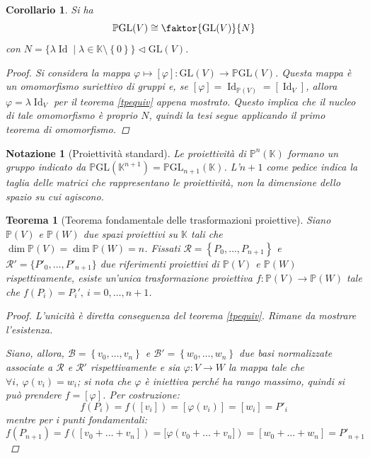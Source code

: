 \documentclass[12pt]{scrartcl}
\theoremstyle{style}
\newtheorem{teorema}{Teorema}[section]
\newtheorem{corollario}{Corollario}[teorema]
\newtheorem{notazione}{Notazione}[section]
\numberwithin{equation}{subsection}
\begin{document}
\begin{corollario}
	Si ha
	\[
		\mathbb{P}\mathrm{GL} (V) \cong \faktor{\mathrm{GL} (V)}{N}
	\] 
	con $N = \big\{ \lambda \operatorname{Id}  \mid \lambda \in \mathbb{K}\setminus\left\{ 0 \right\}  \big\}\lhd \mathrm{GL} (V) $.
	\begin{proof}
		Si considera la mappa $\varphi \mapsto [\varphi ] : \mathrm{GL} (V) \to \mathbb{P}\mathrm{GL} (V)$.
		Questa mappa \`e un omomorfismo suriettivo di gruppi e, se $[\varphi ]= \operatorname{Id} _{\mathbb{P}(V)}=[\operatorname{Id}_V] $, allora $\varphi  = \lambda \operatorname{Id} _V$ per il teorema \ref{tpequiv} appena mostrato.
		Questo implica che il nucleo di tale omomorfismo \`e proprio $N$, quindi la tesi segue applicando il primo teorema di omomorfismo.
	\end{proof}
\end{corollario}
\begin{notazione}[Proiettivit\`a standard]
	Le proiettivit\`a di $\mathbb{P}^n(\mathbb{K})$ formano un gruppo indicato da $\mathbb{P}\mathrm{GL} (\mathbb{K}^{n+1} ) = \mathbb{P}\mathrm{GL} _{n+1} (\mathbb{K})$.
	L'$n+1$ come pedice indica la taglia delle matrici che rappresentano le proiettivit\`a, non la dimensione dello spazio su cui agiscono.
\end{notazione}
\begin{teorema}
	[Teorema fondamentale delle trasformazioni proiettive]
	Siano $\mathbb{P}(V)$ e $\mathbb{P}(W)$ due spazi proiettivi su $\mathbb{K}$ tali che $\dim \mathbb{P}(V) = \dim \mathbb{P}(W) = n$.
	Fissati $\mathcal{R} = \left\{P_0,\ldots,P_{n+1}\right\} $ e $\mathcal{R} ' = \{P'_0,\ldots,P'_{n+1} \}$ due riferimenti proiettivi di $\mathbb{P}(V)$ e $\mathbb{P}(W)$ rispettivamente, esiste un'unica trasformazione proiettiva $f:\mathbb{P}(V)\to \mathbb{P}(W)$ tale che $f(P_i) = P_i', \ i=0,\ldots,n+1$. 
	\begin{proof}
		L'unicit\`a \`e diretta conseguenza del teorema \ref{tpequiv}. 
		Rimane da mostrare l'esistenza.

		Siano, allora, $\mathcal{B} = \left\{ v_0,\ldots,v_n \right\} $ e $\mathcal{B}' = \left\{ w_0,\ldots,w_n \right\} $ due basi normalizzate associate a $\mathcal{R} $ e $\mathcal{R} '$ rispettivamente e sia $\varphi  : V \to W$ la mappa tale che $\forall i, \ \varphi (v_i) = w_i$; si nota che $\varphi $ \`e iniettiva perch\'e ha rango massimo, quindi si pu\`o prendere $f = [\varphi ]$.
		Per costruzione:
		\[
			f(P_i) = f([v_i]) = [\varphi (v_i)] = [w_i]=P'_i
		\] 
		mentre per i punti fondamentali:
		\[
			f(P_{n+1} ) = f([v_0+\ldots+v_n]) = [\varphi (v_0+\ldots+v_n]) = [w_0+\ldots+w_n] = P'_{n+1} 
		\] 
	\end{proof}
\end{teorema}
\end{document}
